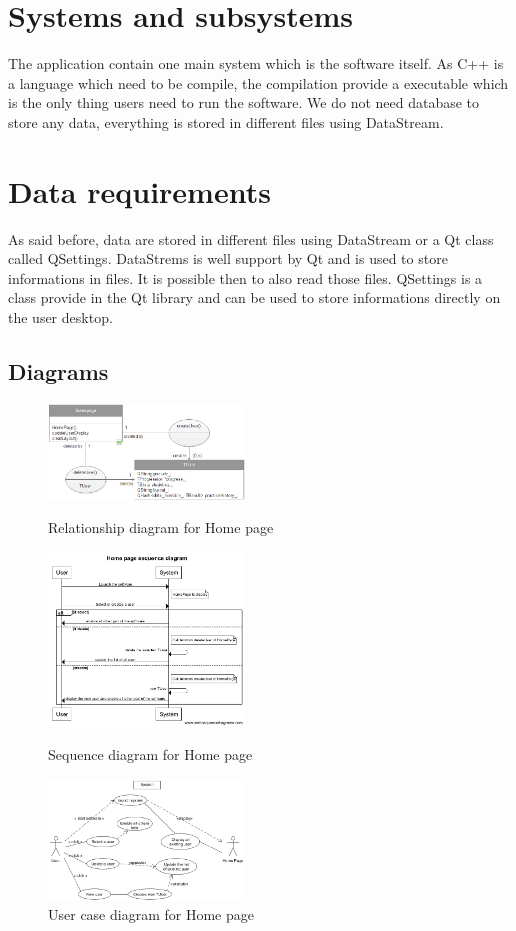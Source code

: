 \section{Systems and subsystems}
The application contain one main system which is the software itself. As C++ is a language which need to be compile, the compilation provide a executable which is the only thing users need to run the software.
We do not need database to store any data, everything is stored in different files using DataStream.  

\section{Data requirements}
As said before, data are stored in different files using DataStream or a Qt class called QSettings. DataStrems is well support by Qt and is used to store informations in files. It is possible then to also read those files. QSettings is a class provide in the Qt library and can be used to store informations directly on the user desktop.

\subsection{Diagrams}
\begin{figure}[h]
	\centering
	\begin{minipage}[b]{0.3\textwidth}
      \includegraphics[width=5.2cm]{diagrams/Rhomepage.png}
      \caption{Relationship diagram for Home page}   
	\end{minipage}
	\begin{minipage}[b]{0.3\textwidth}
      \includegraphics[width=5.2cm]{diagrams/Shomepage.png}
      \caption{Sequence diagram for Home page}
	\end{minipage}
	\begin{minipage}[b]{0.3\textwidth}
      \includegraphics[width=5.2cm]{diagrams/UChomepage.png}
      \caption{User case diagram for Home page}
	\end{minipage}
\end{figure}


